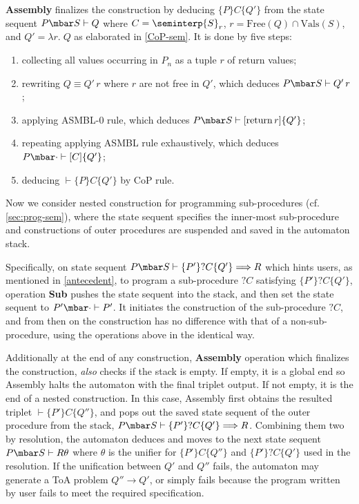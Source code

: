 \textbf{Assembly} finalizes the construction by deducing $\{P\}C\{Q'\}$ from the state sequent $P \mbar S \vdash Q$ where $C = \seminterp{S}_r$, $r = \mathrm{Free}(Q) \cap \mathrm{Vals}(S)$, and $Q' = \lambda r.\; Q$ as elaborated in \cref{CoP-sem}.
It is done by five steps:
\begin{enumerate}
\item collecting all values occurring in $P_n$ as a tuple $r$ of return values;
\item rewriting $Q \equiv Q'\,r$ where $r$ are not free in $Q'$, which deduces $P \mbar S \vdash Q'\,r$;
\item applying ASMBL-0 rule, which deduces $P \mbar S \vdash [\mathrm{return}\,r]\{Q'\}$;
\item repeating applying ASMBL rule exhaustively, which deduces $P \mbar \cdot \vdash [C]\{Q'\}$;
\item deducing $\vdash \{P\}C\{Q'\}$ by CoP rule.
\end{enumerate}

Now we consider nested construction for programming sub-procedures (cf. \cref{sec:prog-sem}), 
where the state sequent specifies the inner-most sub-procedure and constructions of outer procedures are suspended and saved in the automaton stack.


Specifically, on state sequent $P \mbar S \vdash \{P'\}?C\{Q'\} \Longrightarrow R$ which hints users, as mentioned in \cref{antecedent}, to program a sub-procedure $?C$ satisfying $\{P'\}?C\{Q'\}$, operation \textbf{Sub} pushes the state sequent into the stack, and then set the state sequent to $P' \mbar \cdot \vdash P'$.
It initiates the construction of the sub-procedure $?C$, and from then on the construction has no difference with that of a non-sub-procedure, using the operations above in the identical way.

Additionally at the end of any construction, \textbf{Assembly} operation which finalizes the construction, \emph{also} checks if the stack is empty. If empty, it is a global end so Assembly halts the automaton with the final triplet output. If not empty, it is the end of a nested construction. In this case, Assembly first obtains the resulted triplet $\vdash \{P'\}C\{Q''\}$, and pops out the saved state sequent of the outer procedure from the stack, $P \mbar S \vdash \{P'\}?C\{Q'\} \Longrightarrow R$. Combining them two by resolution, the automaton deduces and moves to the next state sequent $P \mbar S \vdash R\theta$ where $\theta$ is the unifier for $\{P'\}C\{Q''\}$ and $\{P'\}?C\{Q'\}$ used in the resolution.
If the unification between $Q'$ and $Q''$ fails, the automaton may generate a ToA problem $Q'' \longrightarrow Q'$, or simply fails because the program written by user fails to meet the required specification.

